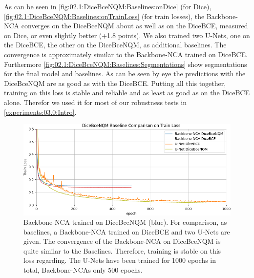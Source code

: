 As can be seen in \autoref{fig:02.1:DiceBceNQM:Baselines:onDice} (for Dice), \autoref{fig:02.1:DiceBceNQM:Baselines:onTrainLoss} (for train losses), the Backbone-NCA converges on the DiceBceNQM about as well as on the DiceBCE, measured on Dice, or even slightly better (+1.8 points). We also trained two U-Nets, one on the DiceBCE, the other on the DiceBceNQM, as additional baselines. The convergence is approximately similar to the Backbone-NCA trained on DiceBCE. Furthermore \autoref{fig:02.1:DiceBceNQM:Baselines:Segmentations} show segmentations for the final model and baselines. As can be seen by eye the predictions with the DiceBceNQM are as good as with the DiceBCE. Putting all this together, training on this loss is stable and reliable and as least as good as on the DiceBCE alone. Therefor we used it for most of our robustness tests in \autoref{experiments:03.0:Intro}. 

\begin{figure}[h!]
    \vspace{0.5cm}
    \centering
        \includegraphics[width=\linewidth]{Graphics/Experiments/2.1_train_loss_freeAxes_Loss_train_0.png}
        \caption{Backbone-NCA trained on DiceBceNQM (blue). For comparison, as baselines, a Backbone-NCA trained on DiceBCE and two U-Nets are given. The convergence of the Backbone-NCA on DiceBceNQM is quite similar to the Baselines. Therefore, training is stable on this loss regarding. The U-Nets have been trained for 1000 epochs in total, Backbone-NCAs only 500 epochs.}
    \label{fig:02.1:DiceBceNQM:Baselines:onTrainLoss}
\end{figure}

